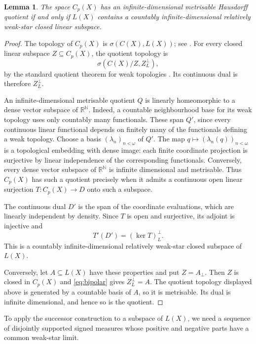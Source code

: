 \documentclass[a4paper,11pt]{amsart}
\theoremstyle{plain}
\newtheorem{lemma}[theorem]{Lemma}
\theoremstyle{definition}
\theoremstyle{remark}
\newcommand{\R}{\mathbb R}
\newcommand{\N}{\mathbb N}
\numberwithin{equation}{section}
\begin{document}
\begin{lemma}\label{lem:dual}
The space $C_p(X)$ has an infinite-dimensional metrisable Hausdorff quotient if and only if $L(X)$ contains a countably infinite-dimensional relatively weak-star closed linear subspace.
\end{lemma}
\begin{proof}
The topology of $C_p(X)$ is $\sigma(C(X),L(X))$; see \cite{Arhangelskii}.
For every closed linear subspace $Z\subseteq C_p(X)$, the quotient topology is
\[
\sigma(C(X)/Z,Z_L^\perp),
\]
by the standard quotient theorem for weak topologies \cite[Chapter~8]{Jarchow}.
Its continuous dual is therefore $Z_L^\perp$.

An infinite-dimensional metrisable quotient $Q$ is linearly homeomorphic
to a dense vector subspace of $\R^\N$. Indeed, a countable neighbourhood
base for its weak topology uses only countably many functionals. These
span $Q'$, since every continuous linear functional depends on finitely
many of the functionals defining a weak topology. Choose a basis
$(\lambda_n)_{n<\omega}$ of $Q'$. The map
$q\mapsto(\lambda_n(q))_{n<\omega}$ is a topological embedding with dense
image: each finite coordinate projection is surjective by linear
independence of the corresponding functionals. Conversely, every dense
vector subspace of $\R^\N$ is infinite dimensional and metrisable.
Thus $C_p(X)$ has such a quotient precisely when it admits a continuous
open linear surjection $T:C_p(X)\to D$ onto such a subspace.

The continuous dual $D'$ is the span of the coordinate evaluations,
which are linearly independent by density. Since $T$ is open and
surjective, its adjoint is injective and
\[
T'(D')=(\ker T)_L^\perp.
\]
This is a countably infinite-dimensional relatively weak-star closed
subspace of $L(X)$.

Conversely, let $A\subseteq L(X)$ have these properties and put
$Z=A_\perp$. Then $Z$ is closed in $C_p(X)$ and \eqref{eq:bipolar} gives
$Z_L^\perp=A$. The quotient topology displayed above is generated by a
countable basis of $A$, so it is metrisable. Its dual is infinite
dimensional, and hence so is the quotient.
\end{proof}

To apply the successor construction to a subspace of $L(X)$, we need
a sequence of disjointly supported signed measures whose positive and
negative parts have a common weak-star limit.
\end{document}
